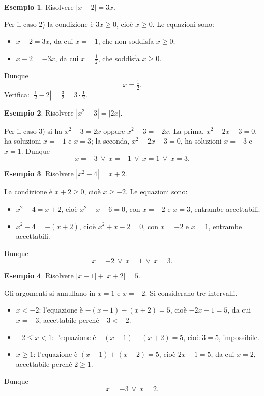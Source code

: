 \documentclass[12pt,a4paper,openany]{book}
\theoremstyle{definition}
\newtheorem{esempio}{Esempio}[section]
\theoremstyle{plain}
\theoremstyle{remark}
\newcommand{\abs}[1]{\left|#1\right|}
\begin{document}
\begin{esempio}
Risolvere $\abs{x-2}=3x$.

Per il caso 2) la condizione è $3x\ge 0$, cioè $x\ge 0$. Le equazioni sono:
\begin{itemize}
\item $x-2=3x$, da cui $x=-1$, che non soddisfa $x\ge 0$;
\item $x-2=-3x$, da cui $x=\tfrac12$, che soddisfa $x\ge 0$.
\end{itemize}
Dunque
\[
x=\tfrac12.
\]
Verifica: $\abs{\tfrac12-2}=\tfrac32=3\cdot\tfrac12$.
\end{esempio}

\begin{esempio}
Risolvere $\abs{x^2-3}=\abs{2x}$.

Per il caso 3) si ha $x^2-3=2x$ oppure $x^2-3=-2x$. La prima, $x^2-2x-3=0$, ha soluzioni $x=-1$ e $x=3$; la seconda, $x^2+2x-3=0$, ha soluzioni $x=-3$ e $x=1$. Dunque
\[
x=-3\ \lor\ x=-1\ \lor\ x=1\ \lor\ x=3.
\]
\end{esempio}

\begin{esempio}
Risolvere $\abs{x^2-4}=x+2$.

La condizione è $x+2\ge 0$, cioè $x\ge -2$. Le equazioni sono:
\begin{itemize}
\item $x^2-4=x+2$, cioè $x^2-x-6=0$, con $x=-2$ e $x=3$, entrambe accettabili;
\item $x^2-4=-(x+2)$, cioè $x^2+x-2=0$, con $x=-2$ e $x=1$, entrambe accettabili.
\end{itemize}
Dunque
\[
x=-2\ \lor\ x=1\ \lor\ x=3.
\]
\end{esempio}

\begin{esempio}
Risolvere $\abs{x-1}+\abs{x+2}=5$.

Gli argomenti si annullano in $x=1$ e $x=-2$. Si considerano tre intervalli.
\begin{itemize}
\item $x<-2$: l'equazione è $-(x-1)-(x+2)=5$, cioè $-2x-1=5$, da cui $x=-3$, accettabile perché $-3<-2$.
\item $-2\le x<1$: l'equazione è $-(x-1)+(x+2)=5$, cioè $3=5$, impossibile.
\item $x\ge 1$: l'equazione è $(x-1)+(x+2)=5$, cioè $2x+1=5$, da cui $x=2$, accettabile perché $2\ge 1$.
\end{itemize}
Dunque
\[
x=-3\ \lor\ x=2.
\]
\end{esempio}
\end{document}

